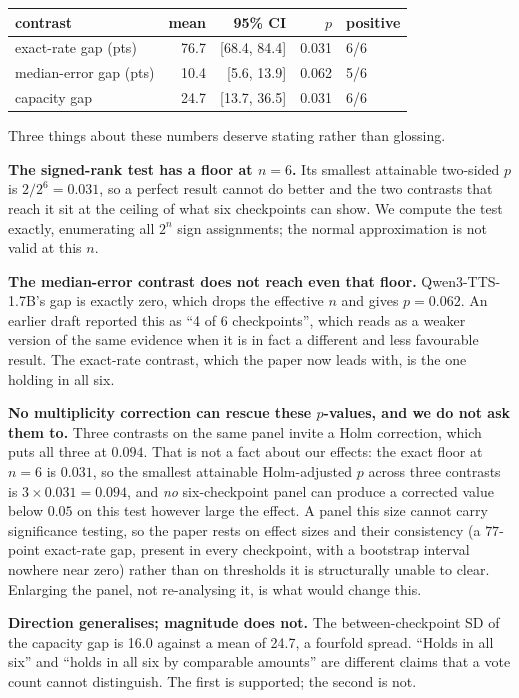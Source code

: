 \documentclass[11pt]{article}
\begin{document}
\begin{center}
\begin{tabular}{lrrrl}
\toprule
contrast & mean & 95\% CI & $p$ & positive \\
\midrule
exact-rate gap (pts) & 76.7 & [68.4, 84.4] & 0.031 & 6/6 \\
median-error gap (pts) & 10.4 & [5.6, 13.9] & 0.062 & 5/6 \\
capacity gap & 24.7 & [13.7, 36.5] & 0.031 & 6/6 \\
\bottomrule
\end{tabular}
\end{center}

Three things about these numbers deserve stating rather than glossing.

\noindent\textbf{The signed-rank test has a floor at $n=6$.} Its smallest
attainable two-sided $p$ is $2/2^6 = 0.031$, so a perfect result cannot do better
and the two contrasts that reach it sit at the ceiling of what six checkpoints
can show. We compute the test exactly, enumerating all $2^n$ sign assignments;
the normal approximation is not valid at this $n$.

\noindent\textbf{The median-error contrast does not reach even that floor.}
Qwen3-TTS-1.7B's gap is exactly zero, which drops the effective $n$ and gives
$p=0.062$. An earlier draft reported this as ``4 of 6 checkpoints'', which
reads as a weaker version of the same evidence when it is in fact a different and
less favourable result. The exact-rate contrast, which the paper now leads with,
is the one holding in all six.

\noindent\textbf{No multiplicity correction can rescue these $p$-values, and we
do not ask them to.} Three contrasts on the same panel invite a Holm correction,
which puts all three at $0.094$. That is not a fact about our effects: the exact
floor at $n=6$ is $0.031$, so the smallest attainable Holm-adjusted $p$ across
three contrasts is $3\times0.031=0.094$, and \emph{no} six-checkpoint panel can
produce a corrected value below $0.05$ on this test however large the effect. A
panel this size cannot carry significance testing, so the paper rests on effect
sizes and their consistency (a $77$-point exact-rate gap, present in every
checkpoint, with a bootstrap interval nowhere near zero) rather than on
thresholds it is structurally unable to clear. Enlarging the panel, not
re-analysing it, is what would change this.

\noindent\textbf{Direction generalises; magnitude does not.} The
between-checkpoint SD of the capacity gap is 16.0 against a mean of
24.7, a fourfold spread. ``Holds in all six'' and ``holds in all six by
comparable amounts'' are different claims that a vote count cannot distinguish.
The first is supported; the second is not.
\end{document}
